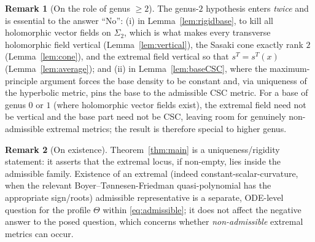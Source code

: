 \documentclass{amsart}
\theoremstyle{definition}
\newtheorem{remark}{Remark}
\begin{document}
\begin{remark}[On the role of genus $\ge2$]
The genus-$2$ hypothesis enters \emph{twice} and is essential to the answer
``No'': (i) in Lemma~\ref{lem:rigidbase}, to kill all holomorphic vector fields
on $\Sigma_2$, which is what makes every transverse holomorphic field vertical
(Lemma~\ref{lem:vertical}), the Sasaki cone exactly rank $2$
(Lemma~\ref{lem:cone}), and the extremal field vertical so that $s^T=s^T(x)$
(Lemma~\ref{lem:average}); and (ii) in Lemma~\ref{lem:baseCSC}, where the
maximum-principle argument forces the base density to be constant and, via
uniqueness of the hyperbolic metric, pins the base to the admissible CSC metric.
For a base of genus $0$ or $1$ (where holomorphic vector fields exist), the
extremal field need not be vertical and the base part need not be CSC, leaving
room for genuinely non-admissible extremal metrics; the result is therefore
special to higher genus.
\end{remark}

\begin{remark}[On existence]
Theorem~\ref{thm:main} is a uniqueness/rigidity statement: it asserts that the
extremal locus, if non-empty, lies inside the admissible family. Existence of an
extremal (indeed constant-scalar-curvature, when the relevant
Boyer--T\o nnesen-Friedman quasi-polynomial has the appropriate sign/roots)
admissible representative is a separate, ODE-level question for the profile
$\Theta$ within \eqref{eq:admissible}; it does not affect the negative answer to
the posed question, which concerns whether \emph{non-admissible} extremal
metrics can occur.
\end{remark}
\end{document}
